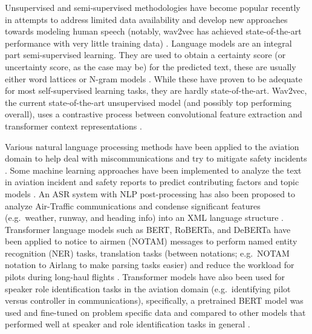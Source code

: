 \documentclass[12pt]{article}
\begin{document}
Unsupervised and semi-supervised methodologies have become popular recently in attempts to address limited data availability
and develop new approaches towards modeling human speech (notably, wav2vec has achieved state-of-the-art performance with
very little training data)
\cite{baevski_wav2vec_2020,badrinath_automatic_2022,srinivasamurthy_semi-supervised_2017,zuluaga-gomez_contextual_2021}.
Language models are an integral part semi-supervised learning. They are used to obtain a certainty score (or uncertainty
score, as the case may be) for the predicted text, these are usually either word lattices or N-gram models
\cite{badrinath_automatic_2022,srinivasamurthy_semi-supervised_2017,zuluaga-gomez_contextual_2021}.
While these have proven to be adequate for most self-supervised learning tasks, they are hardly state-of-the-art.
Wav2vec, the current state-of-the-art unsupervised model (and possibly top performing overall), uses a contrastive process
between convolutional feature extraction and transformer context representations \cite{baevski_wav2vec_2020}.


Various natural language processing methods have been applied to the aviation domain to help deal with miscommunications
and try to mitigate safety incidents \cite{ragnarsdottir_language_2003,tanguy_natural_2016,madeira_machine_2021}.
Some machine learning approaches have been implemented to analyze the text in aviation incident and safety reports to predict
contributing factors and topic models \cite{tanguy_natural_2016,madeira_machine_2021}. An ASR system with NLP post-processing
has also been proposed to analyze Air-Traffic communications and condense significant features (e.g.~weather, runway, and
heading info) into an XML language structure \cite{ragnarsdottir_language_2003}. Transformer language models such as BERT,
RoBERTa, and DeBERTa have been applied to notice to airmen (NOTAM) messages to perform named entity recognition (NER) tasks,
translation tasks (between notations; e.g.~NOTAM notation to Airlang to make parsing tasks easier) and reduce the workload
for pilots during long-haul flights \cite{arnold_knowledge_2022}. Transformer models have also been used for speaker role
identification tasks in the aviation domain (e.g.~identifying pilot versus controller in communications), specifically,
a pretrained BERT model was used and fine-tuned on problem specific data and compared to other models that performed
well at speaker and role identification tasks in general \cite{guo_comparative_2022}.
\end{document}
